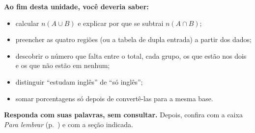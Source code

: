 \begin{sintese}
\textbf{Ao fim desta unidade, você deveria saber:}
\begin{itemize}[leftmargin=1.4em,itemsep=1pt]
  \item calcular $n(A\cup B)$ e explicar por que se subtrai $n(A\cap B)$;
  \item preencher as quatro regiões (ou a tabela de dupla entrada) a partir dos dados;
  \item descobrir o número que falta entre o total, cada grupo, os que estão nos dois e os que não estão em nenhum;
  \item distinguir \enquote{estudam inglês} de \enquote{só inglês};
  \item somar porcentagens só depois de convertê-las para a mesma base.
\end{itemize}
\smallskip\noindent\textbf{Responda com suas palavras, sem consultar.} Depois, confira com a caixa \emph{Para lembrar} (p.~\pageref{lembrar-u5}) e com a seção indicada.
\begin{enumerate}[label=\arabic*.,leftmargin=1.4em]
\end{enumerate}
\end{sintese}

\Respostas
{\small{}}
